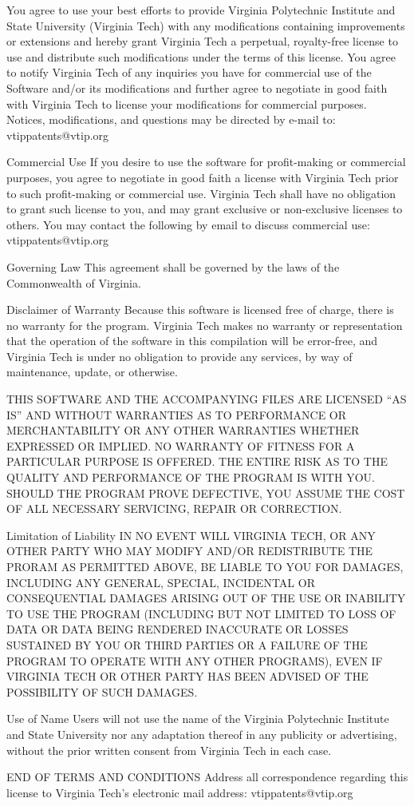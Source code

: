 \documentclass[11pt]{article}
\begin{document}
You agree to use your best efforts to provide Virginia Polytechnic Institute and State University (Virginia Tech) with any modifications containing improvements or extensions and hereby grant Virginia Tech a perpetual, royalty-free license to use and distribute such modifications under the terms of this license.  You agree to notify Virginia Tech of any inquiries you have for commercial use of the Software and/or its modifications and further agree to negotiate in good faith with Virginia Tech to license your modifications for commercial purposes.  Notices, modifications, and questions may be directed by e-mail to: vtippatents@vtip.org

Commercial Use
If you desire to use the software for profit-making or commercial purposes, you agree to negotiate in good faith a license with Virginia Tech prior to such profit-making or commercial use.  Virginia Tech shall have no obligation to grant such license to you, and may grant exclusive or non-exclusive licenses to others.  You may contact the following by email to discuss commercial use: vtippatents@vtip.org

Governing Law
This agreement shall be governed by the laws of the Commonwealth of Virginia.

Disclaimer of Warranty
Because this software is licensed free of charge, there is no warranty for the program.  Virginia Tech makes no warranty or representation that the operation of the software in this compilation will be error-free, and Virginia Tech is under no obligation to provide any services, by way of maintenance, update, or otherwise.

THIS SOFTWARE AND THE ACCOMPANYING FILES ARE LICENSED “AS IS” AND WITHOUT WARRANTIES AS TO PERFORMANCE OR MERCHANTABILITY OR ANY OTHER WARRANTIES WHETHER EXPRESSED OR IMPLIED.  NO WARRANTY OF FITNESS FOR A PARTICULAR PURPOSE IS OFFERED.  THE ENTIRE RISK AS TO THE QUALITY AND PERFORMANCE OF THE PROGRAM IS WITH YOU.  SHOULD THE PROGRAM PROVE DEFECTIVE, YOU ASSUME THE COST OF ALL NECESSARY SERVICING, REPAIR OR CORRECTION.

Limitation of Liability
IN NO EVENT WILL VIRGINIA TECH, OR ANY OTHER PARTY WHO MAY MODIFY AND/OR REDISTRIBUTE THE PRORAM AS PERMITTED ABOVE, BE LIABLE TO YOU FOR DAMAGES, INCLUDING ANY GENERAL, SPECIAL, INCIDENTAL OR CONSEQUENTIAL DAMAGES ARISING OUT OF THE USE OR INABILITY TO USE THE PROGRAM (INCLUDING BUT NOT LIMITED TO LOSS OF DATA OR DATA BEING RENDERED INACCURATE OR LOSSES SUSTAINED BY YOU OR THIRD PARTIES OR A FAILURE OF THE PROGRAM TO OPERATE WITH ANY OTHER PROGRAMS), EVEN IF VIRGINIA TECH OR OTHER PARTY HAS BEEN ADVISED OF THE POSSIBILITY OF SUCH DAMAGES.

Use of Name
Users will not use the name of the Virginia Polytechnic Institute and State University nor any adaptation thereof in any publicity or advertising, without the prior written consent from Virginia Tech in each case.

END OF TERMS AND CONDITIONS
Address all correspondence regarding this license to Virginia Tech’s electronic mail address:  vtippatents@vtip.org
\end{document}
